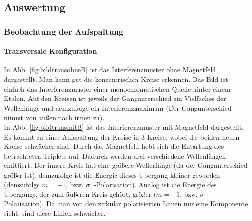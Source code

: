 \newpage
\subsection{Auswertung}
\subsubsection{Beobachtung der Aufspaltung}
\paragraph{Transversale Konfiguration}
In Abb. \ref{fig:bildtransohneB} ist das Interferenzmuster ohne Magnetfeld dargestellt. Man kann gut die konzentrischen Kreise erkennen. Das Bild ist einfach das Interferenzmuster einer monochromatischen Quelle hinter einem Etalon. Auf den Kreisen ist jeweils der Gangunterschied ein Vielfaches der Wellenlänge und demzufolge ein Interferenzmaximum (Der Gangunterschied nimmt von außen nach innen zu).\\
In Abb. \ref{fig:bildtransmitB} ist das Interferenzmuster mit Magnetfeld dargestellt. Es kommt zu einer Aufspaltung der Kreise in 3 Kreise, wobei die beiden neuen Kreise schwächer sind. Durch das Magnetfeld hebt sich die Entartung des betrachteten Triplets auf. Dadurch werden drei verschiedene Wellenlängen emittiert. Der innere Kreis hat eine größere Wellenlänge (da der Gangunterschied größer ist), demzufolge ist die Energie dieses Übergang kleiner geworden (demzufolge $m = -1$, bzw. $\sigma^-$-Polarisation). Analog ist die Energie des Übergangs, der zum äußeren Kreis gehört, größer ($m = +1$, bzw. $\sigma^+$-Polarisation). Da man von den zirkular polarisierten Linien nur eine Komponente sieht, sind diese Linien schwächer.\\

